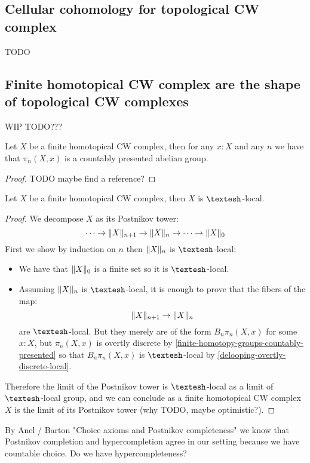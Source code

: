 \subsection{Cellular cohomology for topological CW complex}

TODO


\subsection{Finite homotopical CW complex are the shape of topological CW complexes}

WIP TODO???

\begin{lemma}\label{finite-homotopy-groups-countably-presented}
Let $X$ be a finite homotopical CW complex, then for any $x:X$ and any $n$ we have that $\pi_n(X,x)$ is a countably presented abelian group.
\end{lemma}

\begin{proof}
TODO maybe find a reference?
\end{proof}

\begin{proposition}
Let $X$ be a finite homotopical CW complex, then $X$ is $\shape$-local.
\end{proposition}

\begin{proof}
We decompose $X$ as its Postnikov tower:
\[\cdots\to \lVert X \rVert_{n+1}\to \lVert X \rVert_n\to\cdots \to \lVert X \rVert_0\]
First we show by induction on $n$ then $\lVert X \rVert_n$ is $\shape$-local:
\begin{itemize}
\item We have that $\lVert X \rVert_0$ is a finite set so it is $\shape$-local.
\item Assuming $\lVert X \rVert_n$ is $\shape$-local, it is enough to prove that the fibers of the map:
\[\lVert X \rVert_{n+1}\to \lVert X \rVert_n\]
are $\shape$-local. But they merely are of the form $B_n\pi_n(X,x)$ for some $x:X$, but $\pi_n(X,x)$ is overtly discrete by \cref{finite-homotopy-groups-countably-presented} so that $B_n\pi_n(X,x)$ is $\shape$-local by \cref{delooping-overtly-discrete-local}.
\end{itemize}
Therefore the limit of the Postnikov tower is $\shape$-local as a limit of $\shape$-local group, and we can conclude as a finite homotopical CW complex $X$ is the limit of its Postnikov tower (why TODO, maybe optimistic?).
\end{proof}

\begin{remark}
By Anel / Barton "Choice axioms and Postnikov completeness" we know that Postnikov completion and hypercompletion agree in our setting because we have countable choice. Do we have hypercompleteness?
\end{remark}

